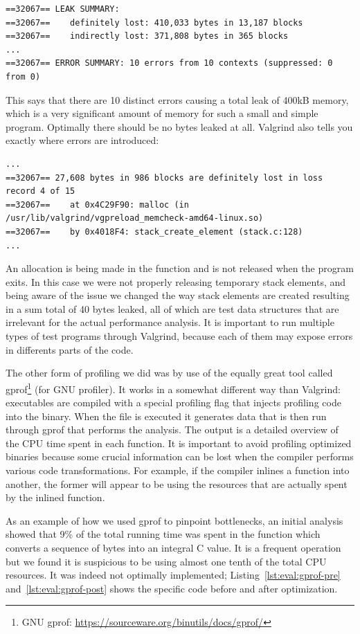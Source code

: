 \begin{verbatim}
==32067== LEAK SUMMARY:
==32067==    definitely lost: 410,033 bytes in 13,187 blocks
==32067==    indirectly lost: 371,808 bytes in 365 blocks
...
==32067== ERROR SUMMARY: 10 errors from 10 contexts (suppressed: 0 from 0)
\end{verbatim}

This says that there are 10 distinct errors causing a total leak of 400kB
memory, which is a very significant amount of memory for such a small and simple
program. Optimally there should be no bytes leaked at all. Valgrind also tells
you exactly where errors are introduced:

\begin{verbatim}
...
==32067== 27,608 bytes in 986 blocks are definitely lost in loss record 4 of 15
==32067==    at 0x4C29F90: malloc (in /usr/lib/valgrind/vgpreload_memcheck-amd64-linux.so)
==32067==    by 0x4018F4: stack_create_element (stack.c:128)
...
\end{verbatim}

An allocation is being made in the function  and is
not released when the program exits. In this case we were not properly releasing
temporary stack elements, and being aware of the issue we changed the way stack
elements are created resulting in a sum total of 40 bytes leaked, all of which
are test data structures that are irrelevant for the actual performance
analysis. It is important to run multiple types of test programs through
Valgrind, because each of them may expose errors in differents parts of the
code.

The other form of profiling we did was by use of the equally great tool called
gprof\footnote{GNU gprof: \url{https://sourceware.org/binutils/docs/gprof/}}
(for GNU profiler). It works in a somewhat different way than Valgrind:
executables are compiled with a special profiling flag that injects profiling
code into the binary. When the file is executed it generates data that is then
run through gprof that performs the analysis. The output is a detailed overview
of the CPU time spent in each function. It is important to avoid profiling
optimized binaries because some crucial information can be lost when the
compiler performs various code transformations. For example, if the compiler
inlines a function into another, the former will appear to be using the
resources that are actually spent by the inlined function.

As an example of how we used gprof to pinpoint bottlenecks, an initial analysis
showed that 9\% of the total running time was spent in the function
 which converts a sequence of bytes into an integral C value. It
is a frequent operation but we found it is suspicious to be using almost one
tenth of the total CPU resources. It was indeed not optimally implemented;
Listing~\ref{lst:eval:gprof-pre} and~\ref{lst:eval:gprof-post} shows the
specific code before and after optimization.

